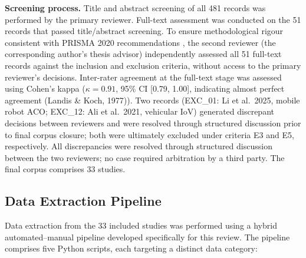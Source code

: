 \documentclass[review,3p,times]{elsarticle}
\begin{document}
\textbf{Screening process.} Title and abstract screening of all 481 records was performed by the primary reviewer. Full-text assessment was conducted on the 51 records that passed title/abstract screening. To ensure methodological rigour consistent with PRISMA 2020 recommendations \cite{page2021}, the second reviewer (the corresponding author's thesis advisor) independently assessed all 51 full-text records against the inclusion and exclusion criteria, without access to the primary reviewer's decisions. Inter-rater agreement at the full-text stage was assessed using Cohen's kappa ($\kappa=0.91$, 95\% CI [0.79, 1.00], indicating almost perfect agreement (Landis \& Koch, 1977)). Two records (EXC\_01: Li et al.\ 2025, mobile robot ACO; EXC\_12: Ali et al.\ 2021, vehicular IoV) generated discrepant decisions between reviewers and were resolved through structured discussion prior to final corpus closure; both were ultimately excluded under criteria E3 and E5, respectively. All discrepancies were resolved through structured discussion between the two reviewers; no case required arbitration by a third party. The final corpus comprises 33 studies.

\subsection{Data Extraction Pipeline}

Data extraction from the 33 included studies was performed using a hybrid automated--manual pipeline developed specifically for this review. The pipeline comprises five Python scripts, each targeting a distinct data category:
\end{document}
